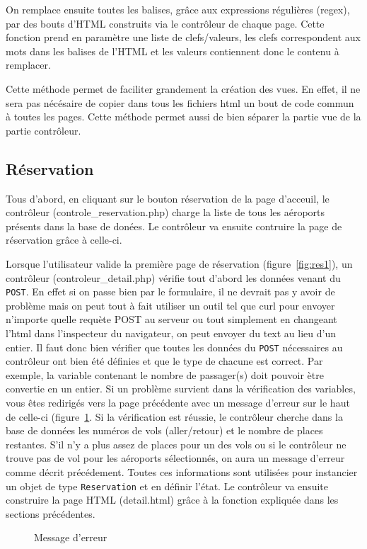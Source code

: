\documentclass[12pt,a4paper]{article}
\begin{document}
		On remplace ensuite toutes les balises, grâce aux expressions régulières (regex), par des bouts d'HTML construits via le contrôleur de chaque page. Cette fonction prend en paramètre une liste de clefs/valeurs, les clefs correspondent aux mots dans les balises de l'HTML et les valeurs contiennent donc le contenu à remplacer.

		Cette méthode permet de faciliter grandement la création des vues. En effet, il ne sera pas nécésaire de copier dans tous les fichiers html un bout de code commun à toutes les pages. Cette méthode permet aussi de bien séparer la partie vue de la partie contrôleur.

		\subsection{Réservation}
      Tous d'abord, en cliquant sur le bouton réservation de la page d'acceuil, le contrôleur (controle\_reservation.php) charge la liste de tous les aéroports présents dans la base de donées. Le contrôleur va ensuite contruire la page de réservation grâce à celle-ci.

			Lorsque l'utilisateur valide la première page de réservation (figure~\ref{fig:res1}), un contrôleur (controleur\_detail.php) vérifie tout d'abord les données venant du \texttt{POST}. En effet si on passe bien par le formulaire, il ne devrait pas y avoir de problème mais on peut tout à fait utiliser un outil tel que curl pour envoyer n'importe quelle requète POST au serveur ou tout simplement en changeant l'html dans l'inspecteur du navigateur, on peut envoyer du text au lieu d'un entier. Il faut donc bien vérifier que toutes les données du \texttt{POST} nécessaires au contrôleur ont bien été définies et que le type de chacune est correct. Par exemple, la variable contenant le nombre de passager(s) doit pouvoir ètre convertie en un entier. Si un problème survient dans la vérification des variables, vous êtes redirigés vers la page précédente avec un message d'erreur sur le haut de celle-ci (figure~\ref{fig:error}. Si la vérification est réussie, le contrôleur cherche dans la base de données les numéros de vols (aller/retour) et le nombre de places restantes. S'il n'y a plus assez de places pour un des vols ou si le contrôleur ne trouve pas de vol pour les aéroports sélectionnés, on aura un message d'erreur comme décrit précédement. Toutes ces informations sont utilisées pour instancier un objet de type \texttt{Reservation} et en définir l'état. Le contrôleur va ensuite construire la page HTML (detail.html) grâce à la fonction expliquée dans les sections précédentes.
			\begin{figure}
				\caption{Message d'erreur}
				\label{fig:error}
			\end{figure}
\end{document}
